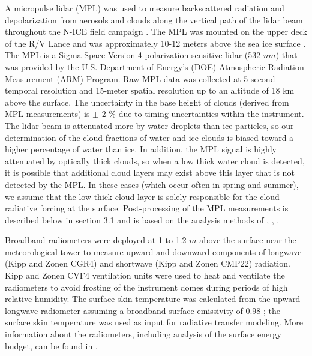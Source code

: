 A micropulse lidar (MPL) was used to measure backscattered radiation and depolarization from aerosols and clouds along the vertical path of the lidar beam throughout the N-ICE field campaign \citep{spinhirne}. The MPL was mounted on the upper deck of the R/V Lance and was approximately 10-12 meters above the sea ice surface \citep{campbell:2002}. The MPL is a Sigma Space Version 4 polarization-sensitive lidar (532 $nm$) that was provided by the U.S. Department of Energy’s (DOE) Atmospheric Radiation Measurement (ARM) Program. Raw MPL data was collected at 5-second temporal resolution and 15-meter spatial resolution up to an altitude of 18 km above the surface. The uncertainty in the base height of clouds (derived from MPL measurements) is $\pm$ 2 $\%$ due to timing uncertainties within the instrument. The lidar beam is attenuated more by water droplets than ice particles, so our determination of the cloud fractions of water and ice clouds is biased toward a higher percentage of water than ice. In addition, the MPL signal is highly attenuated by optically thick clouds, so when a low thick water cloud is detected, it is possible that additional cloud layers may exist above this layer that is not detected by the MPL. In these cases (which occur often in spring and summer), we assume that the low thick cloud layer is solely responsible for the cloud radiative forcing at the surface. Post-processing of the MPL measurements is described below in section 3.1 and is based on the analysis methods of \citet{campbell:2002}, \citet{flynn:2007}, \citet{stillwell:2018}.

Broadband radiometers were deployed at 1 to 1.2 $m$ above the surface near the meteorological tower to measure upward and downward components of longwave (Kipp and Zonen CGR4) and shortwave (Kipp and Zonen CMP22) radiation. Kipp and Zonen CVF4 ventilation units were used to heat and ventilate the radiometers to avoid frosting of the instrument domes during periods of high relative humidity. The surface skin temperature was calculated from the upward longwave radiometer assuming a broadband surface emissivity of 0.98 \citep{grenfell:1999}; the surface skin temperature was used as input for radiative transfer modeling. More information about the radiometers, including analysis of the surface energy budget, can be found in \citet{walden:2017}.

